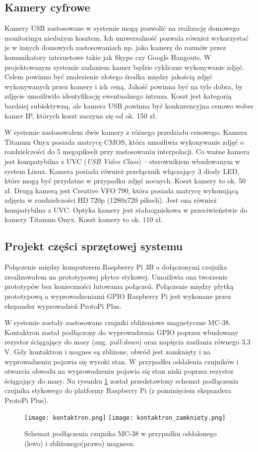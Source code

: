 \documentclass[a4paper,12pt,twoside]{article}
\begin{document}
\subsection{Kamery cyfrowe}
Kamery USB zastosowane w systemie mogą pozwolić na realizację domowego monitoringu niedużym kosztem. Ich uniwersalność pozwala również wykorzystać je w innych domowych zastosowaniach np. jako kamerę do rozmów przez komunikatory internetowe takie jak Skype czy Google Hangouts. W projektowanym systemie zadaniem kamer będzie cykliczne wykonywanie zdjęć. Celem powinno być znalezienie złotego środka między jakością zdjęć wykonywanych przez kamery i ich ceną. Jakość powinna być na tyle dobra, by zdjęcie umożliwiło identyfikację ewentualnego intruza. Koszt jest kategorią bardziej subiektywną, ale kamera USB powinna być konkurencyjna cenowo wobec kamer IP, których koszt zaczyna się od ok. 150 zł.\cite{komputer_świat}

W systemie zastosowałem dwie kamery z różnego przedziału cenowego. Kamera Titanum Onyx posiada matrycę CMOS, która umożliwia wykonywanie zdjęć o rozdzielczości do 5 megapikseli przy zastosowaniu interpolacji. Co ważne kamera jest kompatybilna z UVC (\textit{USB Video Class}) -- sterownikiem wbudowanym w system Linux. Kamera posiada również przełącznik włączający 3 diody LED, które mogą być przydatne w przypadku zdjęć nocnych. Koszt kamery to ok. 50 zł. Drugą kamerą jest Creative VFO 790, która posiada matrycę wykonującą zdjęcia w rozdzielczości HD 720p (1280x720 pikseli). Jest ona również kompatybilna z UVC. Optyka kamery jest stałoogniskowa w przeciwieństwie do kamery Titanum Onyx. Koszt kamery to ok. 110 zł.

\subsection{Projekt części sprzętowej systemu}
Połączenie między komputerem Raspberry Pi 3B a dołączonymi czujnika zrealizowałem na prototypowej płytce stykowej. Umożliwia ona tworzenie prototypów bez konieczności lutowania połączeń. Połączenie między płytką prototypową a wyprowadzeniami GPIO Raspberry Pi jest wykonane przez ekspander wyprowadzeń ProtoPi Plus.

W systemie zostały zastosowane czujniki zbliżeniowe magnetyczne MC-38. Kontaktron został podłączony do wyprowadzenia GPIO poprzez wbudowany rezystor ściągający do masy (ang. \textit{pull-down}) oraz napięcia zasilania równego 3,3 V. Gdy kontaktron i magnes są zbliżone, obwód jest zamknięty i na wyprowadzeniu pojawia się wysoki stan. W przypadku oddalenia czujników i otwarcia obwodu na wyprowadzeniu pojawia się stan niski poprzez rezystor ściągający do masy. Na rysunku \ref{fig: kontaktron} został przedstawiony schemat podłączenia czujnika stykowego do platformy Raspberry Pi (z pominięciem ekspandera ProtoPi Plus).
\begin{figure}[h]
\texttt{[image: kontaktron.png]}
\texttt{[image: kontaktron\_zamkniety.png]}
\caption{Schemat podłączenia czujnika MC-38 w przypadku oddalonego (lewo) i zbliżonego(prawo) magnesu.}
\label{fig: kontaktron}
\end{figure}
\end{document}
